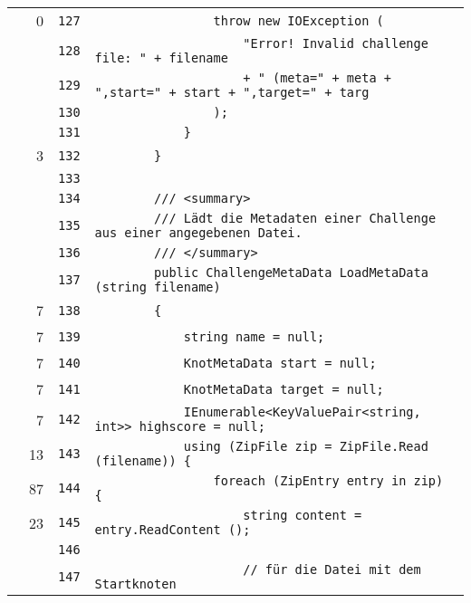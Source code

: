 \documentclass[a4paper,10pt]{article}
\begin{document}
\begin{longtable}[l]{lrrl}
\cellcolor{red} & 0 & \verb~127~ & \verb~                throw new IOException (~\\
\cellcolor{gray} &  & \verb~128~ & \verb~                    "Error! Invalid challenge file: " + filename~\\
\cellcolor{gray} &  & \verb~129~ & \verb~                    + " (meta=" + meta + ",start=" + start + ",target=" + targ~\\
\cellcolor{gray} &  & \verb~130~ & \verb~                );~\\
\cellcolor{gray} &  & \verb~131~ & \verb~            }~\\
\cellcolor{green} & 3 & \verb~132~ & \verb~        }~\\
\cellcolor{gray} &  & \verb~133~ & \verb~~\\
\cellcolor{gray} &  & \verb~134~ & \verb~        /// <summary>~\\
\cellcolor{gray} &  & \verb~135~ & \verb~        /// Lädt die Metadaten einer Challenge aus einer angegebenen Datei.~\\
\cellcolor{gray} &  & \verb~136~ & \verb~        /// </summary>~\\
\cellcolor{gray} &  & \verb~137~ & \verb~        public ChallengeMetaData LoadMetaData (string filename)~\\
\cellcolor{green} & 7 & \verb~138~ & \verb~        {~\\
\cellcolor{green} & 7 & \verb~139~ & \verb~            string name = null;~\\
\cellcolor{green} & 7 & \verb~140~ & \verb~            KnotMetaData start = null;~\\
\cellcolor{green} & 7 & \verb~141~ & \verb~            KnotMetaData target = null;~\\
\cellcolor{green} & 7 & \verb~142~ & \verb~            IEnumerable<KeyValuePair<string, int>> highscore = null;~\\
\cellcolor{green} & 13 & \verb~143~ & \verb~            using (ZipFile zip = ZipFile.Read (filename)) {~\\
\cellcolor{green} & 87 & \verb~144~ & \verb~                foreach (ZipEntry entry in zip) {~\\
\cellcolor{green} & 23 & \verb~145~ & \verb~                    string content = entry.ReadContent ();~\\
\cellcolor{gray} &  & \verb~146~ & \verb~~\\
\cellcolor{gray} &  & \verb~147~ & \verb~                    // für die Datei mit dem Startknoten~\\

\end{longtable}
\end{document}
